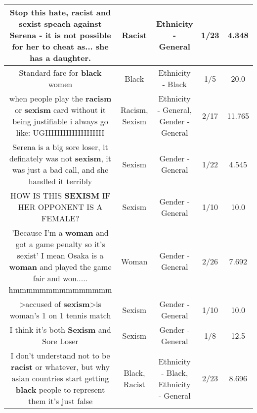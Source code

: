 \documentclass[11pt]{article}
\newlength\mylength
\begin{document}
\begin{center}
\begin{longtable}{|C{.65\mylength}|C{.30\mylength}|C{.12\mylength}|C{.12\mylength}|C{.12\mylength}|}
  \small Stop this hate, \textbf{racist} and sexist speach against Serena - it is not possible for her to cheat as...  she has a daughter.\normalsize   & Racist & Ethnicity - General & 1/23 & 4.348 \\  \hline
  \small Standard fare for \textbf{black} women\normalsize   & Black & Ethnicity - Black & 1/5 & 20.0 \\  \hline
  \small when people play the \textbf{racism} or \textbf{sexism} card without it being justifiable i always go like: UGHHHHHHHHHH\normalsize   & Racism, Sexism & Ethnicity - General, Gender - General & 2/17 & 11.765 \\  \hline
  \small Serena is a big sore loser, it definately was not \textbf{sexism}, it was just a bad call, and she handled it terribly\normalsize   & Sexism & Gender - General & 1/22 & 4.545 \\  \hline
  \small HOW IS THIS \textbf{SEXISM} IF HER OPPONENT IS A FEMALE?\normalsize   & Sexism & Gender - General & 1/10 & 10.0 \\  \hline
  \small 'Because I'm a \textbf{woman} and got a game penalty so it's sexist' I mean Osaka is a \textbf{woman} and played the game fair and won..... hmmmmmmmmmmmmmmm\normalsize   & Woman & Gender - General & 2/26 & 7.692 \\  \hline
  \small >accused of \textbf{sexism}>is woman's 1 on 1 tennis match\normalsize   & Sexism & Gender - General & 1/10 & 10.0 \\  \hline
  \small I think it's both \textbf{Sexism} and Sore Loser\normalsize   & Sexism & Gender - General & 1/8 & 12.5 \\  \hline
  \small I don't understand not to be \textbf{racist} or whatever, but why asian countries start getting \textbf{black} people to represent them it's just false\normalsize   & Black, Racist & Ethnicity - Black, Ethnicity - General & 2/23 & 8.696 \\  \hline

\end{longtable}
\end{center}
\end{document}
